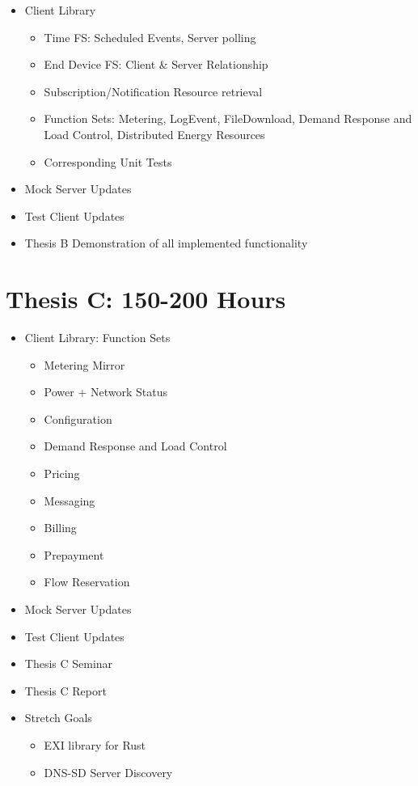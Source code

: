 \begin{itemize}
    \item Client Library
    \begin{itemize}
        \item Time FS: Scheduled Events, Server polling
        \item End Device FS: Client \& Server Relationship
        \item Subscription/Notification Resource retrieval
        \item Function Sets: Metering, LogEvent, FileDownload, Demand Response and Load Control, Distributed Energy Resources
        \item Corresponding Unit Tests
    \end{itemize}
    \item Mock Server Updates
    \item Test Client Updates
    \item Thesis B Demonstration of all implemented functionality
\end{itemize}




\section{Thesis C: 150-200 Hours}

\begin{itemize}
    \item Client Library: Function Sets
    \begin{itemize}
        \item Metering Mirror
        \item Power + Network Status
        \item Configuration
        \item Demand Response and Load Control
        \item Pricing
        \item Messaging
        \item Billing
        \item Prepayment
        \item Flow Reservation
    \end{itemize}
    \item Mock Server Updates
    \item Test Client Updates
    \item Thesis C Seminar
    \item Thesis C Report
    \item Stretch Goals
    \begin{itemize}
        \item EXI library for Rust
        \item DNS-SD Server Discovery
    \end{itemize}
\end{itemize}

